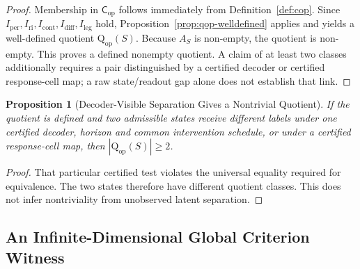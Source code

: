 \documentclass[11pt,a4paper]{article}
\newtheorem{proposition}[theorem]{Proposition}
\theoremstyle{definition}
\newcommand{\Cop}{\mathsf{C}_{\mathrm{op}}}
\newcommand{\Qop}{\mathrm{Q}_{\mathrm{op}}}
\newcommand{\Iper}{I_{\mathrm{per}}}
\newcommand{\Iri}{I_{\mathrm{ri}}}
\newcommand{\Icont}{I_{\mathrm{cont}}}
\newcommand{\Idiff}{I_{\mathrm{diff}}}
\newcommand{\Ileg}{I_{\mathrm{leg}}}
\newcommand{\Aset}{A_S}
\begin{document}
\begin{proof}
Membership in $\Cop$ follows immediately from Definition~\ref{def:cop}. Since $\Iper,\allowbreak \Iri,\allowbreak \Icont,\allowbreak \Idiff,\allowbreak \Ileg$ hold, Proposition~\ref{prop:qop-welldefined} applies and yields a well-defined quotient $\Qop(S)$. Because $\Aset$ is non-empty, the quotient is non-empty. This proves a defined nonempty quotient. A claim of at least two classes additionally requires a pair distinguished by a certified decoder or certified response-cell map; a raw state/readout gap alone does not establish that link.
\end{proof}

\begin{proposition}[Decoder-Visible Separation Gives a Nontrivial Quotient]\label{prop:decoder-visible-separation}
If the quotient is defined and two admissible states receive different labels under one certified decoder, horizon and common intervention schedule, or under a certified response-cell map, then $|\Qop(S)|\ge2$.
\end{proposition}
\begin{proof}
That particular certified test violates the universal equality required for equivalence. The two states therefore have different quotient classes. This does not infer nontriviality from unobserved latent separation.
\end{proof}

\subsection{An Infinite-Dimensional Global Criterion Witness}\label{sec:infinite-global-witness}
\end{document}
